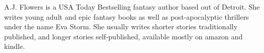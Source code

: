A.J. Flowers is a USA Today Bestselling fantasy author based out of Detroit. She writes young adult and epic fantasy books as well as post-apocalyptic thrillers under the name Eva Storm. She usually writes shorter stories traditionally published, and longer stories self-published,
available mostly on amazon and kindle.